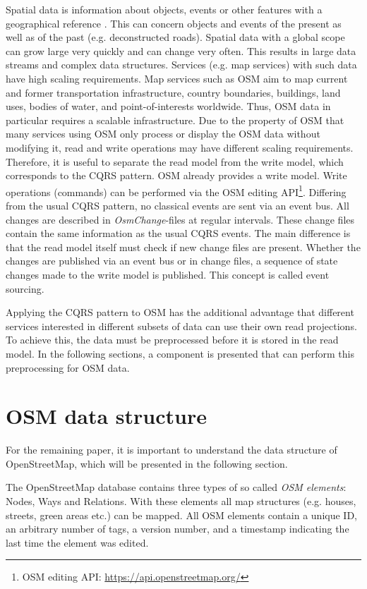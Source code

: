 \documentclass[conference]{IEEEtran}
\begin{document}
Spatial data is information about objects, events or other features with a geographical reference \cite{ibm_gopspatialdata}. This can concern objects and events of the present as well as of the past (e.g. deconstructed roads). Spatial data with a global scope can grow large very quickly and can change very often. This results in large data streams and complex data structures. Services (e.g. map services) with such data have high scaling requirements. Map services such as OSM aim to map current and former transportation infrastructure, country boundaries, buildings, land uses, bodies of water, and point-of-interests worldwide. Thus, OSM data in particular requires a scalable infrastructure. Due to the property of OSM that many services using OSM only process or display the OSM data without modifying it, read and write operations may have different scaling requirements. Therefore, it is useful to separate the read model from the write model, which corresponds to the CQRS pattern. OSM already provides a write model. Write operations (commands) can be performed via the OSM editing API\footnote{OSM editing API: \url{https://api.openstreetmap.org/}}. Differing from the usual CQRS pattern, no classical events are sent via an event bus. All changes are described in \textit{OsmChange}-files at regular intervals. These change files contain the same information as the usual CQRS events. The main difference is that the read model itself must check if new change files are present. Whether the changes are published via an event bus or in change files, a sequence of state changes made to the write model is published. This concept is called event sourcing. \cite{maison_eventsourcing_2019}

Applying the CQRS pattern to OSM has the additional advantage that different services interested in different subsets of data can use their own read projections. To achieve this, the data must be preprocessed before it is stored in the read model. In the following sections, a component is presented that can perform this preprocessing for OSM data.

\section{OSM data structure}
For the remaining paper, it is important to understand the data structure of OpenStreetMap, which will be presented in the following section.

The OpenStreetMap database contains three types of so called \textit{OSM elements}: Nodes, Ways and Relations. With these elements all map structures (e.g. houses, streets, green areas etc.) can be mapped. All OSM elements contain a unique ID, an arbitrary number of tags, a version number, and a timestamp indicating the last time the element was edited. \cite{noauthor_elements_nodate} 
\end{document}
